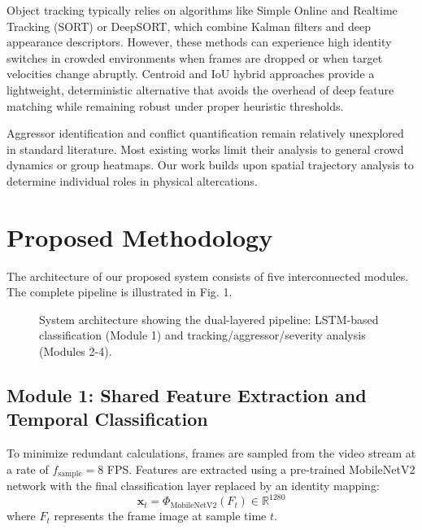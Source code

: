 \documentclass[conference]{IEEEtran}
\begin{document}
Object tracking typically relies on algorithms like Simple Online and Realtime Tracking (SORT) or DeepSORT, which combine Kalman filters and deep appearance descriptors. However, these methods can experience high identity switches in crowded environments when frames are dropped or when target velocities change abruptly. Centroid and IoU hybrid approaches provide a lightweight, deterministic alternative that avoids the overhead of deep feature matching while remaining robust under proper heuristic thresholds.

Aggressor identification and conflict quantification remain relatively unexplored in standard literature. Most existing works limit their analysis to general crowd dynamics or group heatmaps. Our work builds upon spatial trajectory analysis to determine individual roles in physical altercations.

\section{Proposed Methodology}
The architecture of our proposed system consists of five interconnected modules. The complete pipeline is illustrated in Fig. 1.

\begin{figure}[htbp]
\centering
\caption{System architecture showing the dual-layered pipeline: LSTM-based classification (Module 1) and tracking/aggressor/severity analysis (Modules 2-4).}
\label{fig:pipeline}
\end{figure}

\subsection{Module 1: Shared Feature Extraction and Temporal Classification}
To minimize redundant calculations, frames are sampled from the video stream at a rate of $f_{\text{sample}} = 8$ FPS. Features are extracted using a pre-trained MobileNetV2 network with the final classification layer replaced by an identity mapping:
\begin{equation}
\mathbf{x}_t = \Phi_{\text{MobileNetV2}}(F_t) \in \mathbb{R}^{1280}
\end{equation}
where $F_t$ represents the frame image at sample time $t$. 
\end{document}
